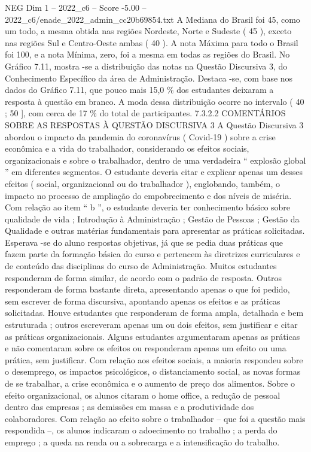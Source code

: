 \begin{textsample}{NEG Dim 1 – 2022\_c6 – Score -5.00 – 2022\_c6/enade\_2022\_admin\_cc20b69854.txt}
A Mediana do Brasil foi 45, como um todo, a mesma obtida nas regiões Nordeste, Norte e Sudeste ( 45 ), exceto nas regiões Sul e Centro-Oeste ambas ( 40 ).
A nota Máxima para todo o Brasil foi 100, e a nota Mínima, zero, foi a mesma em todas as regiões do Brasil.
No Gráfico 7.11, mostra -se a distribuição das notas na Questão Discursiva 3, do Conhecimento Específico da área de Administração.
Destaca -se, com base nos dados do Gráfico 7.11, que pouco mais 15,0 \% dos estudantes deixaram a resposta à questão em branco.
A moda dessa distribuição ocorre no intervalo ( 40 ; 50 ], com cerca de 17 \% do total de participantes. 7.3.2.2 COMENTÁRIOS SOBRE AS RESPOSTAS À QUESTÃO DISCURSIVA 3 A Questão Discursiva 3 abordou o impacto da pandemia do coronavírus ( Covid-19 ) sobre a crise econômica e a vida do trabalhador, considerando os efeitos sociais, organizacionais e sobre o trabalhador, dentro de uma verdadeira “ explosão global ” em diferentes segmentos.
O estudante deveria citar e explicar apenas um desses efeitos ( social, organizacional ou do trabalhador ), englobando, também, o impacto no processo de ampliação do empobrecimento e dos níveis de miséria.
Com relação ao item “ b ”, o estudante deveria ter conhecimento básico sobre qualidade de vida ; Introdução à Administração ; Gestão de Pessoas ; Gestão da Qualidade e outras matérias fundamentais para apresentar as práticas solicitadas.
Esperava -se do aluno respostas objetivas, já que se pedia duas práticas que fazem parte da formação básica do curso e pertencem às diretrizes curriculares e de conteúdo das disciplinas do curso de Administração.
Muitos estudantes responderam de forma similar, de acordo com o padrão de resposta.
Outros responderam de forma bastante direta, apresentando apenas o que foi pedido, sem escrever de forma discursiva, apontando apenas os efeitos e as práticas solicitadas.
Houve estudantes que responderam de forma ampla, detalhada e bem estruturada ; outros escreveram apenas um ou dois efeitos, sem justificar e citar as práticas organizacionais.
Alguns estudantes argumentaram apenas as práticas e não comentaram sobre os efeitos ou responderam apenas um efeito ou uma prática, sem justificar.
Com relação aos efeitos sociais, a maioria respondeu sobre o desemprego, os impactos psicológicos, o distanciamento social, as novas formas de se trabalhar, a crise econômica e o aumento de preço dos alimentos.
Sobre o efeito organizacional, os alunos citaram o home office, a redução de pessoal dentro das empresas ; as demissões em massa e a produtividade dos colaboradores.
Com relação ao efeito sobre o trabalhador – que foi a questão mais respondida –, os alunos indicaram o adoecimento no trabalho ; a perda do emprego ; a queda na renda ou a sobrecarga e a intensificação do trabalho.

\end{textsample}

